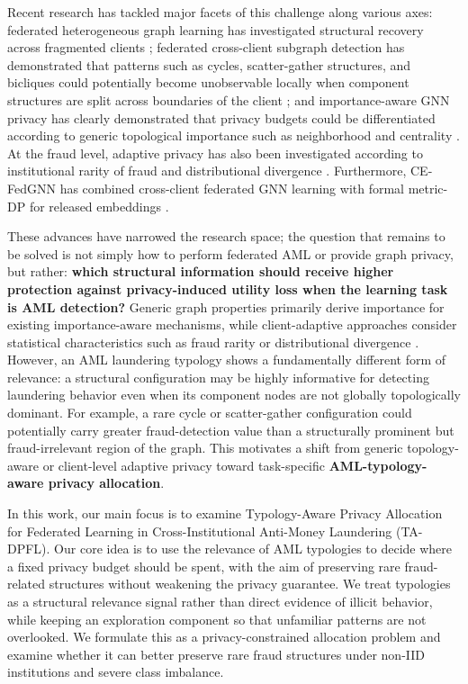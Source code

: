 \documentclass[conference]{IEEEtran}
\begin{document}
Recent research has tackled major facets of this challenge along various axes: federated heterogeneous graph learning has investigated structural recovery across fragmented clients \cite{b6}; federated cross-client subgraph detection has demonstrated that patterns such as cycles, scatter-gather structures, and bicliques could potentially become unobservable locally when component structures are split across boundaries of the client \cite{b7}; and importance-aware GNN privacy has clearly demonstrated that privacy budgets could be differentiated according to generic topological importance such as neighborhood and centrality \cite{b8}. At the fraud level, adaptive privacy has also been investigated according to institutional rarity of fraud and distributional divergence \cite{b9}. Furthermore, CE-FedGNN has combined cross-client federated GNN learning with formal metric-DP for released embeddings \cite{b3}.

These advances have narrowed the research space; the question that remains to be solved is not simply how to perform federated AML or provide graph privacy, but rather: \textbf{which structural information should receive higher protection against privacy-induced utility loss when the learning task is AML detection?} Generic graph properties primarily derive importance for existing importance-aware mechanisms, while client-adaptive approaches consider statistical characteristics such as fraud rarity or distributional divergence \cite{b8, b9}. However, an AML laundering typology shows a fundamentally different form of relevance: a structural configuration may be highly informative for detecting laundering behavior even when its component nodes are not globally topologically dominant. For example, a rare cycle or scatter-gather configuration could potentially carry greater fraud-detection value than a structurally prominent but fraud-irrelevant region of the graph. This motivates a shift from generic topology-aware or client-level adaptive privacy toward task-specific \textbf{AML-typology-aware privacy allocation}.

In this work, our main focus is to examine Typology-Aware Privacy Allocation for Federated Learning in Cross-Institutional Anti-Money Laundering (TA-DPFL). Our core idea is to use the relevance of AML typologies to decide where a fixed privacy budget should be spent, with the aim of preserving rare fraud-related structures without weakening the privacy guarantee. We treat typologies as a structural relevance signal rather than direct evidence of illicit behavior, while keeping an exploration component so that unfamiliar patterns are not overlooked. We formulate this as a privacy-constrained allocation problem and examine whether it can better preserve rare fraud structures under non-IID institutions and severe class imbalance.
\end{document}
